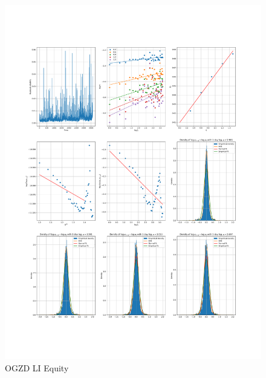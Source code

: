     \begin{figure}[h]
        \centering
        \includegraphics[width=\textwidth]{fig/OGZD LI Equity.pdf}
        \caption{OGZD LI Equity}
    \end{figure} 
        
